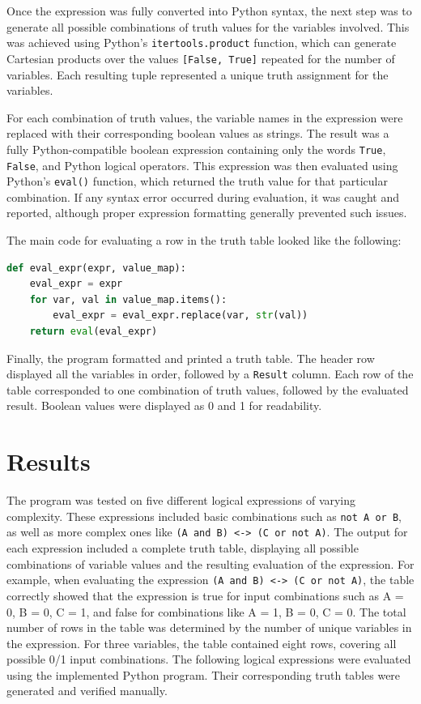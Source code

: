 \documentclass[a4paper, journal]{IEEEtran}
\begin{document}
Once the expression was fully converted into Python syntax, the next step was to generate all possible combinations of truth values for the variables involved. This was achieved using Python's \texttt{itertools.product} function, which can generate Cartesian products over the values \texttt{[False, True]} repeated for the number of variables. Each resulting tuple represented a unique truth assignment for the variables.

For each combination of truth values, the variable names in the expression were replaced with their corresponding boolean values as strings. The result was a fully Python-compatible boolean expression containing only the words \texttt{True}, \texttt{False}, and Python logical operators. This expression was then evaluated using Python's \texttt{eval()} function, which returned the truth value for that particular combination. If any syntax error occurred during evaluation, it was caught and reported, although proper expression formatting generally prevented such issues.

The main code for evaluating a row in the truth table looked like the following:

\begin{lstlisting}[language=Python, caption=Evaluating a truth table row]
def eval_expr(expr, value_map):
    eval_expr = expr
    for var, val in value_map.items():
        eval_expr = eval_expr.replace(var, str(val))
    return eval(eval_expr)
\end{lstlisting}

Finally, the program formatted and printed a truth table. The header row displayed all the variables in order, followed by a \texttt{Result} column. Each row of the table corresponded to one combination of truth values, followed by the evaluated result. Boolean values were displayed as 0 and 1 for readability.

\section{Results}
The program was tested on five different logical expressions of varying complexity. These expressions included basic combinations such as \texttt{not A or B}, as well as more complex ones like \texttt{(A and B) <-> (C or not A)}. The output for each expression included a complete truth table, displaying all possible combinations of variable values and the resulting evaluation of the expression. For example, when evaluating the expression \texttt{(A and B) <-> (C or not A)}, the table correctly showed that the expression is true for input combinations such as A = 0, B = 0, C = 1, and false for combinations like A = 1, B = 0, C = 0. The total number of rows in the table was determined by the number of unique variables in the expression. For three variables, the table contained eight rows, covering all possible 0/1 input combinations.
The following logical expressions were evaluated using the implemented Python program. Their corresponding truth tables were generated and verified manually.
\end{document}
